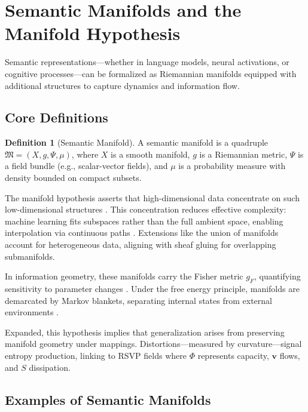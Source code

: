 \documentclass{article}
\theoremstyle{definition}
\newtheorem{definition}{Definition}[section]
\begin{document}
\section{Semantic Manifolds and the Manifold Hypothesis}

Semantic representations—whether in language models, neural activations, or cognitive processes—can be formalized as Riemannian manifolds equipped with additional structures to capture dynamics and information flow.

\subsection{Core Definitions}

\begin{definition}[Semantic Manifold]
A semantic manifold is a quadruple $\mathfrak{M} = (X, g, \Psi, \mu)$, where $X$ is a smooth manifold, $g$ is a Riemannian metric, $\Psi$ is a field bundle (e.g., scalar-vector fields), and $\mu$ is a probability measure with density bounded on compact subsets.
\end{definition}

The manifold hypothesis asserts that high-dimensional data concentrate on such low-dimensional structures \citep{fefferman2016testing,gorban2018blessing}. This concentration reduces effective complexity: machine learning fits subspaces rather than the full ambient space, enabling interpolation via continuous paths \citep{chollet2021deep}. Extensions like the union of manifolds \citep{brown2023union} account for heterogeneous data, aligning with sheaf gluing for overlapping submanifolds.

In information geometry, these manifolds carry the Fisher metric $g_F$, quantifying sensitivity to parameter changes \citep{caticha2015geometry}. Under the free energy principle, manifolds are demarcated by Markov blankets, separating internal states from external environments \citep{kirchhoff2018markov}.

Expanded, this hypothesis implies that generalization arises from preserving manifold geometry under mappings. Distortions—measured by curvature—signal entropy production, linking to RSVP fields where $\Phi$ represents capacity, $\mathbf{v}$ flows, and $S$ dissipation.

\subsection{Examples of Semantic Manifolds}
\end{document}
